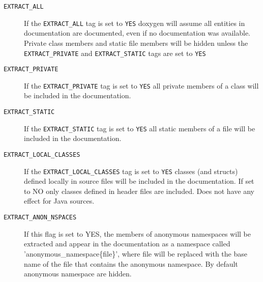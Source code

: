  \begin{description}
\item[{\tt EXTRACT\_\-ALL} ] If the {\tt EXTRACT\_\-ALL} tag is set to {\tt YES} doxygen will assume all entities in documentation are documented, even if no documentation was available. Private class members and static file members will be hidden unless the {\tt EXTRACT\_\-PRIVATE} and {\tt EXTRACT\_\-STATIC} tags are set to {\tt YES} 

\label{config_cfg_extract_private}
\hypertarget{config_cfg_extract_private}{}
 \item[{\tt EXTRACT\_\-PRIVATE} ] If the {\tt EXTRACT\_\-PRIVATE} tag is set to {\tt YES} all private members of a class will be included in the documentation.

\label{config_cfg_extract_static}
\hypertarget{config_cfg_extract_static}{}
 \item[{\tt EXTRACT\_\-STATIC} ] If the {\tt EXTRACT\_\-STATIC} tag is set to {\tt YES} all static members of a file will be included in the documentation.

\label{config_cfg_extract_local_classes}
\hypertarget{config_cfg_extract_local_classes}{}
 \item[{\tt EXTRACT\_\-LOCAL\_\-CLASSES} ] If the {\tt EXTRACT\_\-LOCAL\_\-CLASSES} tag is set to {\tt YES} classes (and structs) defined locally in source files will be included in the documentation. If set to NO only classes defined in header files are included. Does not have any effect for Java sources.

\label{config_cfg_extract_anon_nspaces}
\hypertarget{config_cfg_extract_anon_nspaces}{}
 \item[{\tt EXTRACT\_\-ANON\_\-NSPACES} ] If this flag is set to YES, the members of anonymous namespaces will be extracted and appear in the documentation as a namespace called 'anonymous\_\-namespace\{file\}', where file will be replaced with the base name of the file that contains the anonymous namespace. By default anonymous namespace are hidden.


\end{description}
